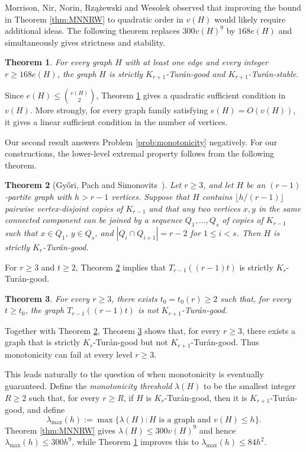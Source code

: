 \documentclass[11pt]{article}
\numberwithin{equation}{section}
\newtheorem{theorem}{Theorem}[section]
\theoremstyle{definition}
\theoremstyle{remark}
\begin{document}
Morrison, Nir, Norin, Rz\k{a}\.zewski and Wesolek \cite{MorrisonEtAl} observed that improving the bound in Theorem \ref{thm:MNNRW} to quadratic order in $v(H)$ would likely require additional ideas. The following theorem replaces $300v(H)^9$ by $168e(H)$ and simultaneously gives strictness and stability.

\begin{theorem}
\label{thm:main}
For every graph $H$ with at least one edge and every integer $r\ge 168e(H)$, the graph $H$ is strictly $K_{r+1}$-Tur\'an-good and $K_{r+1}$-Tur\'an-stable.
\end{theorem}

Since $e(H)\le\binom{v(H)}2$, Theorem \ref{thm:main} gives a quadratic sufficient condition in $v(H)$. More strongly, for every graph family satisfying $e(H)=O(v(H))$, it gives a linear sufficient condition in the number of vertices.

Our second result answers Problem \ref{prob:monotonicity} negatively. For our constructions, the lower-level extremal property follows from the following theorem.

\begin{theorem}[Gy\H{o}ri, Pach and Simonovits~\cite{GyoriPachSimonovits}]
\label{thm:GPS}
Let $r\ge 3$, and let $H$ be an $(r-1)$-partite graph with $h>r-1$ vertices. Suppose that $H$ contains $\lfloor h/(r-1)\rfloor$ pairwise vertex-disjoint copies of $K_{r-1}$ and that any two vertices $x,y$ in the same connected component can be joined by a sequence $Q_1,\ldots,Q_s$ of copies of $K_{r-1}$ such that $x\in Q_1$, $y\in Q_s$, and $|Q_i\cap Q_{i+1}|=r-2$ for $1\le i<s$. Then $H$ is strictly $K_r$-Tur\'an-good.
\end{theorem}

For $r\ge 3$ and $t\ge 2$, Theorem \ref{thm:GPS} implies that $T_{r-1}((r-1)t)$ is strictly $K_r$-Tur\'an-good.

\begin{theorem}
\label{thm:multipartite-counterexample}
For every $r\ge 3$, there exists $t_0=t_0(r)\ge 2$ such that, for every $t\ge t_0$, the graph $T_{r-1}((r-1)t)$ is not $K_{r+1}$-Tur\'an-good.
\end{theorem}

Together with Theorem \ref{thm:GPS}, Theorem \ref{thm:multipartite-counterexample} shows that, for every $r\ge3$, there exists a graph that is strictly $K_r$-Tur\'an-good but not $K_{r+1}$-Tur\'an-good. Thus monotonicity can fail at every level $r\ge3$.

This leads naturally to the question of when monotonicity is eventually guaranteed. Define the \emph{monotonicity threshold} $\lambda(H)$ to be the smallest integer $R\ge2$ such that, for every $r\ge R$, if $H$ is $K_r$-Tur\'an-good, then it is $K_{r+1}$-Tur\'an-good, and define
\[
\lambda_{\max}(h):=\max\{\lambda(H):H\text{ is a graph and }v(H)\le h\}.
\]
Theorem \ref{thm:MNNRW} gives $\lambda(H)\le300v(H)^9$ and hence $\lambda_{\max}(h)\le300h^9$, while Theorem \ref{thm:main} improves this to $\lambda_{\max}(h)\le84h^2$.
\end{document}
